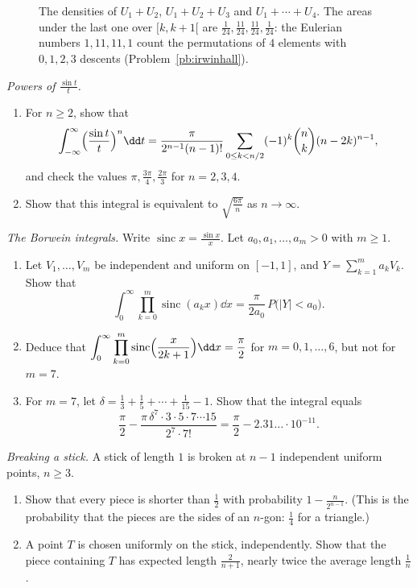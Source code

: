 \begin{figure}[ht]
\centering
{}
\caption{The densities of $U_1+U_2$, $U_1+U_2+U_3$ and $U_1+\cdots+U_4$. The areas under the last one over $[k,k+1[$ are
$\frac1{24},\frac{11}{24},\frac{11}{24},\frac1{24}$: the Eulerian numbers $1,11,11,1$ count the permutations of $4$ elements with $0,1,2,3$
descents (Problem~\ref{pb:irwinhall}).}
\label{fig:irwinhall}
\end{figure}

\begin{exercise}[$\star\star$]\label{pb:sincpower}
\emph{Powers of $\frac{\sin t}t$.}
\begin{enumerate}[label=(\alph*)]
\item For $n\ge2$, show that
\[
\int_{-\infty}^\infty\Bigl(\frac{\sin t}t\Bigr)^n\dd t=\frac\pi{2^{n-1}(n-1)!}\sum_{0\le k<n/2}(-1)^k\binom nk(n-2k)^{n-1},
\]
and check the values $\pi,\frac{3\pi}4,\frac{2\pi}3$ for $n=2,3,4$.
\item Show that this integral is equivalent to $\sqrt{\frac{6\pi}n}$ as $n\to\infty$.
\end{enumerate}
\end{exercise}

\begin{exercise}[$\star\star\star$]\label{pb:borwein}
\emph{The Borwein integrals.} Write $\operatorname{sinc}x=\frac{\sin x}x$. Let $a_0,a_1,\dots,a_m>0$ with $m\ge1$.
\begin{enumerate}[label=(\alph*)]
\item Let $V_1,\dots,V_m$ be independent and uniform on $[-1,1]$, and $Y=\sum_{k=1}^ma_kV_k$. Show that
\[
\int_0^\infty\prod_{k=0}^m\operatorname{sinc}(a_kx)\dd x=\frac\pi{2a_0}\,P\bigl(|Y|<a_0\bigr).
\]
\item Deduce that $\displaystyle\int_0^\infty\prod_{k=0}^m\operatorname{sinc}\Bigl(\frac x{2k+1}\Bigr)\dd x=\frac\pi2$ for $m=0,1,\dots,6$, but not for $m=7$.
\item For $m=7$, let $\delta=\frac13+\frac15+\cdots+\frac1{15}-1$. Show that the integral equals
\[
\frac\pi2-\frac{\pi\,\delta^7\cdot3\cdot5\cdot7\cdots15}{2^7\cdot7!}=\frac\pi2-2.31\ldots\cdot10^{-11}.
\]
\end{enumerate}
\end{exercise}

\begin{exercise}[$\star$]\label{pb:stick}
\emph{Breaking a stick.} A stick of length $1$ is broken at $n-1$ independent uniform points, $n\ge3$.
\begin{enumerate}[label=(\alph*)]
\item Show that every piece is shorter than $\frac12$ with probability $1-\frac n{2^{n-1}}$. (This is the probability that the pieces
are the sides of an $n$-gon: $\frac14$ for a triangle.)
\item A point $T$ is chosen uniformly on the stick, independently. Show that the piece containing $T$ has expected length $\frac2{n+1}$,
nearly twice the average length $\frac1n$.
\end{enumerate}
\end{exercise}


